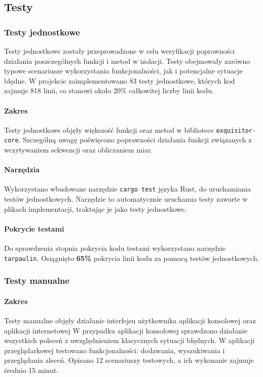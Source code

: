     \subsection{Testy}

        \subsubsection{Testy jednostkowe}

            Testy jednostkowe zostały przeprowadzone w celu weryfikacji poprawności działania poszczególnych funkcji i metod w izolacji. Testy obejmowały zarówno typowe scenariusze wykorzystania funkcjonalności, jak i potencjalne sytuacje błędne. W projekcie zaimplementowano 83 testy jednostkowe, których kod zajmuje 818 linii, co stanowi około 20\% całkowitej liczby linii kodu.

            \paragraph{Zakres}
            Testy jednostkowe objęły większość funkcji oraz metod w bibliotece \texttt{exquisitor-core}. Szczególną uwagę poświęcono poprawności działania funkcji związanych z wczytywaniem sekwencji oraz obliczaniem miar.

            \paragraph{Narzędzia}
            Wykorzystano wbudowane narzędzie \texttt{cargo test} języka Rust, do uruchamiania testów jednostkowych. Narzędzie to automatycznie uruchamia testy zawarte w plikach implementacji, traktując je jako testy jednostkowe.

            \paragraph{Pokrycie testami}
            Do sprawdzenia stopnia pokrycia kodu testami wykorzystano narzędzie \texttt{tarpaulin}\cite{Rust:tarpaulin}.
            Osiągnięto \textbf{65\%} pokrycia linii kodu za pomocą testów jednostkowych.

        \subsubsection{Testy manualne}

            \paragraph{Zakres}
            Testy manualne objęły działanie interfejsu użytkownika aplikacji konsolowej oraz aplikacji internetowej W przypadku aplikacji konsolowej sprawdzono działanie wszystkich poleceń z uwzględnieniem klasycznych sytuacji błędnych. W aplikacji przeglądarkowej testowano funkcjonalności: dodawania, wyszukiwania i przeglądania zleceń. Opisano 12 scenariuszy testowych, a ich wykonanie zajmuje średnio 15 minut.

